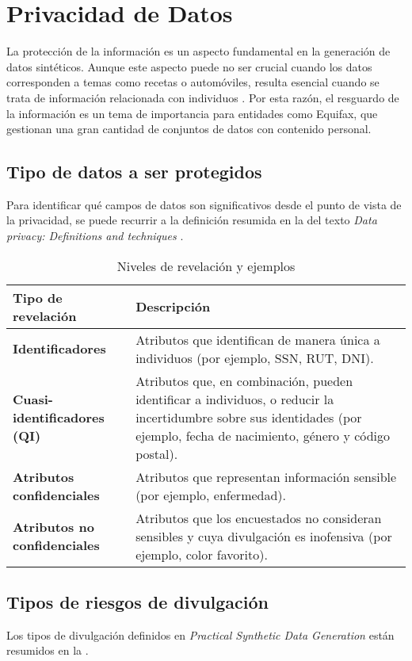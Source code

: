 \newpage
\section{Privacidad de Datos}
La protección de la información es un aspecto fundamental en la generación de datos sintéticos. Aunque este aspecto puede no ser crucial cuando los datos corresponden a temas como recetas o automóviles, resulta esencial cuando se trata de información relacionada con individuos \cite{bruce_practical_2020}. Por esta razón, el resguardo de la información es un tema de importancia para entidades como Equifax, que gestionan una gran cantidad de conjuntos de datos con contenido personal.

\subsection{Tipo de datos a ser protegidos}
Para identificar qué campos de datos son significativos desde el punto de vista de la privacidad, se puede recurrir a la definición resumida en la  del texto \emph{Data privacy: Definitions and techniques} \cite{de_capitani_di_vimercati_data_2012}.

\begin{table}[H]
	\centering
	\caption{Niveles de revelación y ejemplos}
	\label{data-relevante}
    \begin{tabular}{|m{15em}|m{25em}|}
    \hline
    \rowcolor[gray]{0.8}
    Tipo de revelación & Descripción \\
    \hline
    \textbf{Identificadores} 
    & Atributos que identifican de manera única a individuos (por ejemplo, SSN, RUT, DNI). \\
    \hline
    \textbf{Cuasi-identificadores (QI)} 
    & Atributos que, en combinación, pueden identificar a individuos, o reducir la incertidumbre sobre sus identidades (por ejemplo, fecha de nacimiento, género y código postal). \\
    \hline
    \textbf{Atributos confidenciales} 
    & Atributos que representan información sensible (por ejemplo, enfermedad). \\
    \hline
    \textbf{Atributos no confidenciales} 
    & Atributos que los encuestados no consideran sensibles y cuya divulgación es inofensiva (por ejemplo, color favorito). \\
    \hline
    \end{tabular}
\end{table}

\newpage
\subsection{Tipos de riesgos de divulgación}
Los tipos de divulgación definidos en \emph{Practical Synthetic Data Generation} \cite{bruce_practical_2020} están resumidos en la .

